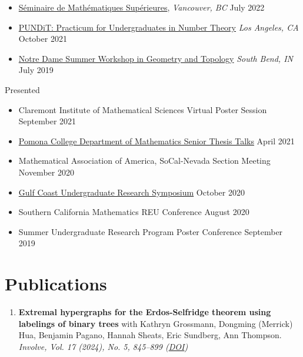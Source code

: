 \documentclass[margin,line]{res}
\begin{document}
\begin{resume}
\begin{itemize}
  \item \href{https://www.pims.math.ca/scientific-event/220711-sdms2fht}{Séminaire de Mathématiques Supérieures}, {\em Vancouver, BC} \hfill July 2022
  \item \href{http://www.ipam.ucla.edu/programs/special-events-and-conferences/pundit-practicum-for-undergraduates-in-number-theory/?tab=schedule}{PUNDiT: Practicum for Undergraduates in Number Theory} {\em Los Angeles, CA} \hfill October 2021
  \item \href{https://www3.nd.edu/~gszekely/rtg/summer.html}{Notre Dame Summer Workshop in Geometry and Topology} {\em South Bend, IN} \hfill July 2019
\end{itemize}
Presented
 \begin{itemize}
  \renewcommand\labelitemi{--}
  \item Claremont Institute of Mathematical Sciences Virtual Poster Session  \hfill September 2021
  \item \href{https://www.pomona.edu/academics/departments/mathematics-statistics/research/senior-theses}{Pomona College Department of Mathematics Senior Thesis Talks} \hfill April 2021
  \item Mathematical Association of America, SoCal-Nevada Section Meeting \hfill November 2020
  \item \href{https://mathweb.rice.edu/news/2020-gulf-coast-undergraduate-research-symposium}{Gulf Coast Undergraduate Research Symposium} \hfill October 2020
  \item Southern California Mathematics REU Conference \hfill August 2020
  \item Summer Undergraduate Research Program Poster Conference \hfill September 2019
\end{itemize}

\section{\sc Publications}

\begin{enumerate}
  \item \textbf{Extremal hypergraphs for the Erdos-Selfridge theorem using labelings of binary trees} with Kathryn Grossmann, Dongming (Merrick) Hua, Benjamin Pagano, Hannah Sheats, Eric Sundberg, Ann Thompson.\\
  \emph{Involve, Vol. 17 (2024), No. 5, 845–899 (\href{https://msp.org/involve/2024/17-5/p07.xhtml}{DOI})}
\end{enumerate}


\end{resume}
\end{document}
